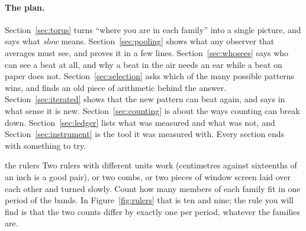 \paragraph{The plan.}
Section~\ref{sec:torus} turns ``where you are in each family'' into a
single picture, and says what \emph{slow} means. Section~\ref{sec:pooling}
shows what any observer that averages must see, and proves it in a few
lines. Section~\ref{sec:whosees} says who can see a beat at all, and why a
beat in the air needs an ear while a beat on paper does not.
Section~\ref{sec:selection} asks which of the many possible patterns wins,
and finds an old piece of arithmetic behind the answer.
Section~\ref{sec:iterated} shows that the new pattern can beat again, and
says in what sense it is new. Section~\ref{sec:counting} is about the ways
counting can break down. Section~\ref{sec:ledger} lists what was measured
and what was not, and Section~\ref{sec:instrument} is the tool it was
measured with. Every section ends with something to try.

\begin{tryit}{the rulers}
Two rulers with different units work (centimetres against sixteenths of an
inch is a good pair), or two combs, or two pieces of window screen laid
over each other and turned slowly. Count how many members of each family fit
in one period of the bands. In Figure~\ref{fig:rulers} that is ten and nine;
the rule you will find is that the two counts differ by exactly one per
period, whatever the families are.
\end{tryit}

